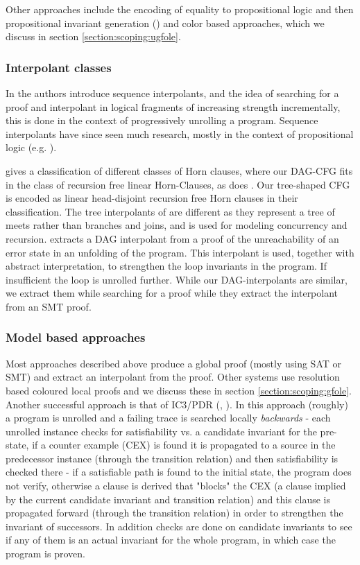 Other approaches include the encoding of equality to propositional logic and then propositional invariant generation (\cite{DBLP:conf/fmcad/KroeningW07}) and color based approaches, which we discuss in section \ref{section:scoping:ugfole}.

\subsubsection*{Interpolant classes}
In \cite{JhalaMcMillan06} the authors introduce sequence interpolants, and the idea of searching for a proof and interpolant in logical fragments of increasing strength incrementally, this is done in the context of progressively unrolling a program. Sequence interpolants have since seen much research, mostly in the context of propositional logic (e.g. \cite{DBLP:conf/fmcad/VizelG09}).

\cite{DBLP:conf/vstte/RummerHK13} gives a classification of different classes of Horn clauses, where our DAG-CFG fits in the class of recursion free linear Horn-Clauses,
 as does \cite{AlbarghouthiGurfinkelChechik12}. Our tree-shaped CFG is encoded as linear head-disjoint recursion free Horn clauses in their classification. The tree interpolants of \cite{BlancGuptaKovacsKragl13} are different as they represent a tree of meets rather than branches and joins, and is used for modeling concurrency and recursion.
\cite{AlbarghouthiGurfinkelChechik12} extracts a DAG interpolant from a proof of the unreachability of an error state in an unfolding of the program.
This interpolant is used, together with abstract interpretation, to strengthen the loop invariants in the program. 
If insufficient the loop is unrolled further. While our DAG-interpolants are similar, we extract them while searching for a proof while they extract the interpolant from an SMT proof.

\subsubsection*{Model based approaches}
Most approaches described above produce a global proof (mostly using SAT or SMT) and extract an interpolant from the proof.
Other systems use resolution based coloured local proofs and we discuss these in section \ref{section:scoping:gfole}.
Another successful approach is that of IC3/PDR (\cite{DBLP:conf/vmcai/Bradley11}, \cite{DBLP:conf/fmcad/EenMB11}).
In this approach (roughly) a program is unrolled and a failing trace is searched locally \emph{backwards} - 
each unrolled instance checks for satisfiability vs. a candidate invariant for the pre-state, if a counter example (CEX) is found it is propagated to a source in the predecessor instance (through the transition relation) and then satisfiability is checked there - if a satisfiable path is found to the initial state, the program does not verify, otherwise a clause is derived that "blocks" the CEX (a clause implied by the current candidate invariant and transition relation) and this clause is propagated forward (through the transition relation) in order to strengthen the invariant of successors. In addition checks are done on candidate invariants to see if any of them is an actual invariant for the whole program, in which case the program is proven.

